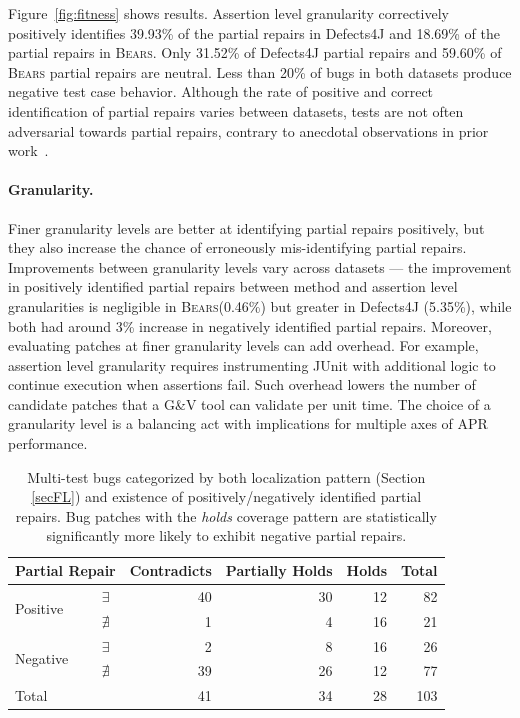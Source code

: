 \documentclass[10pt, conference]{IEEEtran}
\newcommand\bears{\textsc{Bears}\xspace}
\begin{document}
Figure~\ref{fig:fitness} shows results.
Assertion level granularity correctively positively identifies
39.93\% of the partial repairs in Defects4J
and 18.69\% of the partial repairs in \bears.
Only 31.52\% of Defects4J partial repairs and 
59.60\% 
of \bears partial repairs are neutral. Less than 20\% of bugs in both datasets
produce negative test case behavior.
Although the rate of positive and correct identification of partial repairs varies between datasets,
tests are not often adversarial towards partial repairs, contrary to anecdotal
observations in prior work~\cite{gecco09}.

\paragraph{Granularity.} Finer granularity levels are better at identifying partial repairs positively,
but they also increase the chance of erroneously mis-identifying partial repairs.
Improvements between granularity levels vary across datasets --- the improvement 
in positively identified partial repairs between method and assertion level granularities
is negligible in \bears (0.46\%) but greater in Defects4J (5.35\%), while both had around 3\% 
increase in negatively identified partial repairs.
Moreover, evaluating patches at finer granularity levels can add overhead.
For example, assertion level granularity requires instrumenting JUnit with additional
logic to continue execution when assertions fail.
Such overhead lowers the number of
candidate patches that a G\&V tool can validate per unit time.
The choice of a granularity level is a balancing act with implications for
multiple axes of APR performance.


\begin{table}
  {\begin{center}
      \begin{tabular} {llrrrr}
        \toprule
        \multicolumn{2}{c}{Partial Repair} & Contradicts & Partially Holds & Holds & Total \\
        \midrule
        \multirow{2}{*}{Positive} & $\exists$  & 40 & 30 & 12 &  82 \\
                                  & $\nexists$ &  1 &  4 & 16 &  21 \\
        \midrule
        \multirow{2}{*}{Negative} & $\exists$  &  2 &  8 & 16 &  26 \\
                                  & $\nexists$ & 39 & 26 & 12 &  77 \\
        \midrule
        Total                     &            & 41 & 34 & 28 & 103 \\
        \bottomrule
      \end{tabular}
    \end{center}
  }
  \caption{\small Multi-test bugs categorized by both localization pattern
    (Section \ref{secFL}) and existence of positively/negatively identified
    partial repairs. Bug patches with the \emph{holds} coverage pattern are
    statistically significantly more likely to exhibit negative partial
    repairs.  \label{tab:cov_fitness}}
\end{table}
\end{document}

